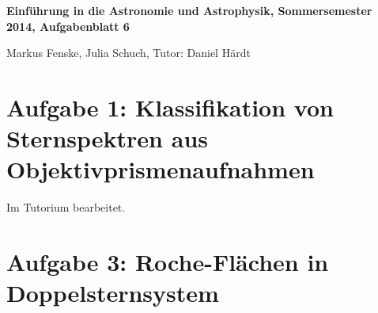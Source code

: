 \documentclass[a4paper,german,12pt,smallheadings]{scrartcl}
\begin{document}
\allowdisplaybreaks %
\begin{center}
\bfseries %
\sffamily %
\vspace{-40pt}
Einführung in die Astronomie und Astrophysik, Sommersemester 2014, Aufgabenblatt 6

Markus Fenske, Julia Schuch, Tutor: Daniel Härdt
\vspace{-10pt}
\end{center}
\section*{Aufgabe 1: Klassifikation von Sternspektren aus Objektivprismenaufnahmen}
Im Tutorium bearbeitet.

\section*{Aufgabe 3: Roche-Flächen in Doppelsternsystem}
\end{document}

